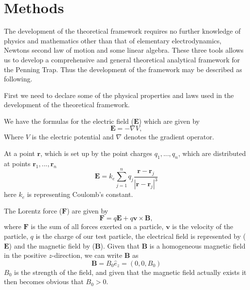 \documentclass[english,notitlepage,reprint,nofootinbib]{revtex4-1}  %
\begin{document}
	\section{Methods}\label{sec:methods}
	
	The development of the theoretical framework requires no further knowledge of physics and mathematics other than that of elementary electrodynamics, Newtons second law of motion and some linear algebra. These three tools allows us to develop a comprehensive and general theoretical analytical framework for the Penning Trap. Thus the development of the framework may be described as following. 
	
	First we need to declare some of the physical properties and laws used in the development of the theoretical framework.
	
	We have the formulas for the electric field ($\mathbf{E}$) which are given by
	\begin{equation} \label{eq:electric field}
		\mathbf{E} = -\nabla V,
	\end{equation}
	Where $V$ is the electric potential and $\nabla$ denotes the gradient operator.
	
	At a point $\mathbf{r}$, which is set up by the point charges ${q_1, ..., q_n}$, which are distributed at points ${\mathbf{r}_1, ..., \mathbf{r}_n}$
	\begin{equation} \label{eq:electric field2}
		\mathbf{E} = k_e \sum_{j=1}^n q_j \frac{\mathbf{r}-\mathbf{r}_j}{|\mathbf{r}-\mathbf{r}_j|^3}
	\end{equation}
	here $k_e$ is representing Coulomb’s constant.
	
	The Lorentz force ($\mathbf{F}$) are given by
	\begin{equation} \label{eq:Lorentz force}
		\mathbf{F} = q\mathbf{E} + q\mathbf{v}\times \mathbf{B},
	\end{equation}
	where $\mathbf{F}$ is the sum of all forces exerted on a particle, $\mathbf{v}$ is the velocity of the particle, $q$ is the charge of our test particle, the electrical field is represented by ($\mathbf{E}$) and the magnetic field by ($\mathbf{B}$). Given that $\mathbf{B}$ is a homogeneous magnetic field in the positive $z$-direction, we can write $\mathbf{B}$ as
	\begin{equation} \label{eq:Bfield}
		\mathbf{B} = B_0\hat{e}_z = (0, 0, B_0)
	\end{equation}
	$B_0$ is the strength of the field, and given that the magnetic field actually exists it then becomes obvious that $B_0 > 0$.
	
\end{document}
